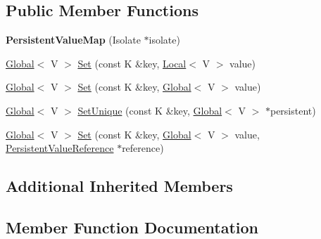 \subsection*{Public Member Functions}
\begin{DoxyCompactItemize}
\item 
\mbox{\label{classv8_1_1PersistentValueMap_af8000a75ef84fa719724dc4dadc1e5ee}} 
{\bfseries Persistent\+Value\+Map} (Isolate $\ast$isolate)
\item 
\mbox{\hyperlink{classv8_1_1Global}{Global}}$<$ V $>$ \mbox{\hyperlink{classv8_1_1PersistentValueMap_a4527a2e1b25a9f1772317f948382d9f9}{Set}} (const K \&key, \mbox{\hyperlink{classv8_1_1Local}{Local}}$<$ V $>$ value)
\item 
\mbox{\hyperlink{classv8_1_1Global}{Global}}$<$ V $>$ \mbox{\hyperlink{classv8_1_1PersistentValueMap_a00f89f1b7665698349f98b04d0059180}{Set}} (const K \&key, \mbox{\hyperlink{classv8_1_1Global}{Global}}$<$ V $>$ value)
\item 
\mbox{\hyperlink{classv8_1_1Global}{Global}}$<$ V $>$ \mbox{\hyperlink{classv8_1_1PersistentValueMap_a97ab74c7670e65dd5f95ec2940c4ab11}{Set\+Unique}} (const K \&key, \mbox{\hyperlink{classv8_1_1Global}{Global}}$<$ V $>$ $\ast$persistent)
\item 
\mbox{\hyperlink{classv8_1_1Global}{Global}}$<$ V $>$ \mbox{\hyperlink{classv8_1_1PersistentValueMap_a8128f8cff6ed0f3177e966b28cc081ba}{Set}} (const K \&key, \mbox{\hyperlink{classv8_1_1Global}{Global}}$<$ V $>$ value, \mbox{\hyperlink{classv8_1_1PersistentValueMapBase_1_1PersistentValueReference}{Persistent\+Value\+Reference}} $\ast$reference)
\end{DoxyCompactItemize}
\subsection*{Additional Inherited Members}


\subsection{Member Function Documentation}
\mbox{\label{classv8_1_1PersistentValueMap_a4527a2e1b25a9f1772317f948382d9f9}} 
